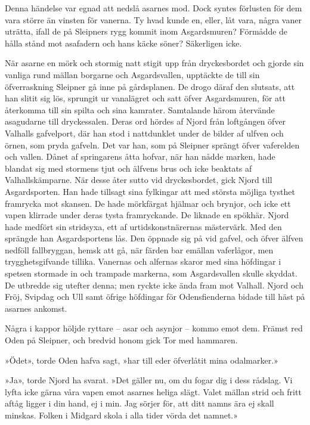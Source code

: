 Denna händelse var egnad att nedslå asarnes mod. Dock syntes förlusten
för dem vara större än vinsten för vanerna. Ty hvad kunde en, eller, låt
vara, några vaner uträtta, ifall de på Sleipners rygg kommit inom
Asgardsmuren? Förmådde de hålla stånd mot asafadern och hans käcke
söner? Säkerligen icke.

När asarne en mörk och stormig natt stigit upp från dryckesbordet och
gjorde sin vanliga rund mällan borgarne och Asgardsvallen, upptäckte de
till sin öfverraskning
Sleipner
gå inne på gårdsplanen. De drogo däraf den slutsats, att han slitit sig
lös, sprungit ur vanalägret och satt öfver Asgardsmuren, för att
återkomma till sin spilta och sina kamrater. Samtalande härom återvände
asagudarne till dryckessalen. Deras ord hördes af Njord från loftgången
öfver Valhalls gafvelport, där han stod i nattdunklet under de bilder af
ulfven och örnen, som pryda gafveln. Det var han, som på Sleipner
sprängt öfver vaferelden och vallen. Dånet af springarens åtta hofvar,
när han nådde marken, hade blandat sig med stormens tjut och älfvens
brus och icke beaktats af Valhallskämparne. När desse åter sutto vid
dryckesbordet, gick Njord till Asgardsporten. Han hade tillsagt sina
fylkingar att med största möjliga tysthet framrycka mot skansen. De hade
mörkfärgat hjälmar och brynjor, och icke ett vapen klirrade under deras
tysta framryckande. De liknade en spökhär. Njord hade medfört sin
stridsyxa, ett af urtidskonstnärernas mästervärk. Med den sprängde han
Asgardsportens lås. Den öppnade sig på vid gafvel, och öfver älfven
nedföll fallbryggan, hemsk att gå, när färden bar emällan vaferlågor,
men trygghetsgifvande tillika. Vanernas och alfernas skaror med sina
höfdingar i spetsen stormade in och trampade markerna, som Asgardsvallen
skulle skyddat. De utbredde sig utefter denna; men ryckte icke ända fram
mot Valhall. Njord och Fröj, Svipdag och Ull samt öfrige höfdingar för
Odensfienderna bidade till häst på asarnes ankomst.

Några i kappor höljde ryttare -- asar och asynjor -- kommo emot dem.
Främst red Oden på Sleipner, och bredvid honom gick Tor med hammaren.

»Ödet», torde Oden hafva sagt, »har till eder öfverlåtit mina
odalmarker.»

»Ja», torde Njord ha svarat. »Det gäller nu, om du fogar dig i dess
rådslag. Vi lyfta icke gärna våra vapen emot asarnes heliga slägt. Valet
mällan strid och fritt aftåg ligger i din hand, ej i min. Jag sörjer
för, att ditt namns ära ej skall minskas. Folken i Midgard skola i alla
tider vörda det namnet.»



